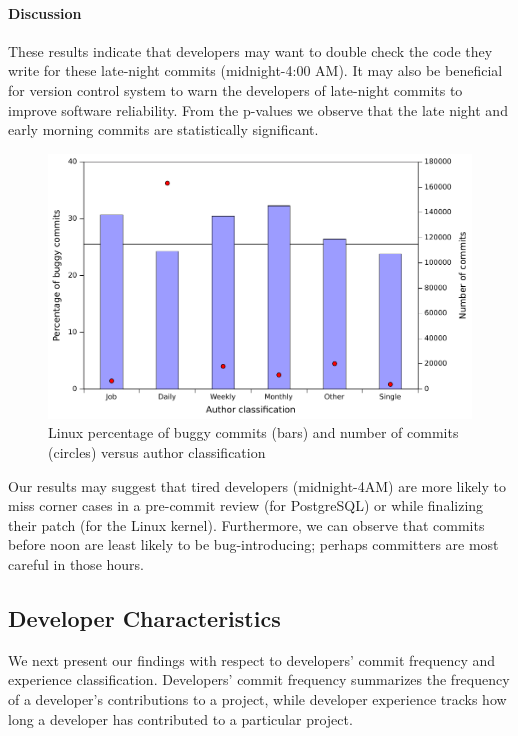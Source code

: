 \paragraph{Discussion}

These results indicate that developers may want to double check the code they
write for these late-night commits (midnight-4:00 AM).  It may also be
beneficial for version control system to warn the developers of late-night
commits to improve software reliability. From the p-values we observe that the
late night and early morning commits are statistically significant.

\begin{figure}[t!hb]
\begin{center}
\includegraphics[width=\columnwidth]{linux-bugginess-author-class.pdf}
\end{center}
\caption{\label{fig-linux-bugginess-author-class}Linux percentage of buggy
  commits (bars) and number of commits (circles) versus author classification}
\end{figure}

Our results may suggest that tired developers (midnight-4AM) are more likely to
miss corner cases in a pre-commit review (for PostgreSQL) or while finalizing
their patch (for the Linux kernel). Furthermore, we can observe that commits
before noon are least likely to be bug-introducing; perhaps committers are most
careful in those hours.

\subsection{Developer Characteristics}
\label{sec-dev-char}

We next present our findings with respect to developers' commit frequency and
experience classification. Developers' commit frequency summarizes the frequency
of a developer's contributions to a project, while developer experience tracks
how long a developer has contributed to a particular project.


